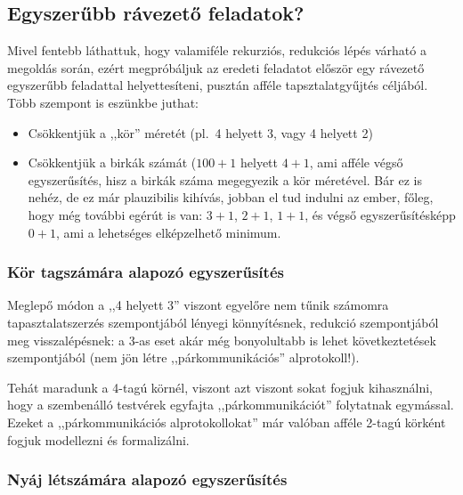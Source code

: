 \documentclass{article}
\begin{document}
	\subsection{Egyszerűbb rávezető feladatok?}

	Mivel fentebb láthattuk, hogy valamiféle rekurziós, redukciós lépés várható a megoldás során, ezért megpróbáljuk az eredeti feladatot először egy rávezető egyszerűbb feladattal helyettesíteni, pusztán afféle tapsztalatgyűjtés céljából. Több szempont is eszünkbe juthat:

	\begin{itemize}
		\item Csökkentjük a ,,kör'' méretét (pl.~4 helyett 3, vagy 4 helyett 2)
		\item Csökkentjük a birkák számát ($100 + 1$ helyett $4 +1$, ami afféle végső egyszerűsítés, hisz a birkák száma megegyezik a kör méretével. Bár ez is nehéz, de ez már plauzibilis kihívás, jobban el tud indulni az ember, főleg, hogy még további egérút is van: $3 +1$, $2 + 1$, $1 + 1$, és végső egyszerűsítésképp $0 + 1$, ami a lehetséges elképzelhető minimum.
	\end{itemize}

	\subsubsection{Kör tagszámára alapozó egyszerűsítés}

	Meglepő módon a ,,4 helyett 3'' viszont egyelőre nem tűnik számomra tapasztalatszerzés szempontjából  lényegi könnyítésnek, redukció szempontjából meg  visszalépésnek: a 3-as eset akár még bonyolultabb is lehet következtetések szempontjából (nem jön létre ,,párkommunikációs'' alprotokoll!).

	Tehát maradunk a 4-tagú körnél, viszont azt viszont sokat fogjuk kihasználni, hogy a szembenálló testvérek egyfajta ,,párkommunikációt'' folytatnak egymással. Ezeket a ,,párkommunikációs alprotokollokat'' már valóban afféle 2-tagú körként fogjuk modellezni és formalizálni.%


	\subsubsection{Nyáj létszámára alapozó egyszerűsítés}
\end{document}
